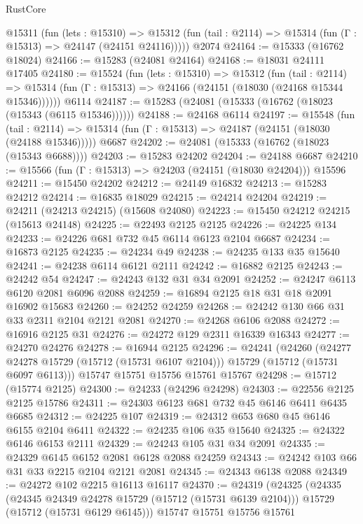 \begin{lexlean}{RustCore}
\begin{coremodule}
    @15311
      (fun (lets : @15310) =>
      @15312 (fun (tail : @2114) => @15314 (fun (Γ : @15313) => @24147 (@24151 @24116)))))
    @2074
@24164 := @15333 (@16762 @18024)
@24166 := @15283 (@24081 @24164)
@24168 := @18031 @24111 @17405
@24180 := @15524
    (fun (lets : @15310) =>
    @15312
      (fun (tail : @2114) =>
      @15314 (fun (Γ : @15313) => @24166 (@24151 (@18030 (@24168 @15344 @15346))))))
    @6114
@24187 := @15283 (@24081 (@15333 (@16762 (@18023 (@15343 (@6115 @15346))))))
@24188 := @24168 @6114
@24197 := @15548
    (fun (tail : @2114) => @15314 (fun (Γ : @15313) => @24187 (@24151 (@18030 (@24188 @15346)))))
    @6687
@24202 := @24081 (@15333 (@16762 (@18023 (@15343 @6688))))
@24203 := @15283 @24202
@24204 := @24188 @6687
@24210 := @15566 (fun (Γ : @15313) => @24203 (@24151 (@18030 @24204))) @15596
@24211 := @15450 @24202
@24212 := @24149 @16832
@24213 := @15283 @24212
@24214 := @16835 @18029
@24215 := @24214 @24204
@24219 := @24211 (@24213 @24215) (@15608 @24080)
@24223 := @15450 @24212 @24215 (@15613 @24148)
@24225 := @22493 @2125 @2125
@24226 := @24225 @134
@24233 := @24226 @681 @732 @45 @6114 @6123 @2104 @6687
@24234 := @16873 @2125
@24235 := @24234 @49
@24238 := @24235 @133 @35 @15640
@24241 := @24238 @6114 @6121 @2111
@24242 := @16882 @2125
@24243 := @24242 @54
@24247 := @24243 @132 @31 @34 @2091
@24252 := @24247 @6113 @6120 @2081 @6096 @2088
@24259 := @16894 @2125 @18 @31 @18 @2091 @16902 @15683
@24260 := @24252 @24259
@24268 := @24242 @130 @66 @31 @33 @2311 @2104 @2121 @2081
@24270 := @24268 @6106 @2088
@24272 := @16916 @2125 @31
@24276 := @24272 @129 @2311 @16339 @16343
@24277 := @24270 @24276
@24278 := @16944 @2125
@24296 := @24241
    (@24260
      (@24277 @24278 @15729 (@15712 (@15731 @6107 @2104)))
      @15729
      (@15712 (@15731 @6097 @6113)))
    @15747
    @15751
    @15756
    @15761
    @15767
@24298 := @15712 (@15774 @2125)
@24300 := @24233 (@24296 @24298)
@24303 := @22556 @2125 @2125 @15786
@24311 := @24303 @6123 @681 @732 @45 @6146 @6411 @6435 @6685
@24312 := @24225 @107
@24319 := @24312 @653 @680 @45 @6146 @6155 @2104 @6411
@24322 := @24235 @106 @35 @15640
@24325 := @24322 @6146 @6153 @2111
@24329 := @24243 @105 @31 @34 @2091
@24335 := @24329 @6145 @6152 @2081 @6128 @2088 @24259
@24343 := @24242 @103 @66 @31 @33 @2215 @2104 @2121 @2081
@24345 := @24343 @6138 @2088
@24349 := @24272 @102 @2215 @16113 @16117
@24370 := @24319
    (@24325
      (@24335
        (@24345 @24349 @24278 @15729 (@15712 (@15731 @6139 @2104)))
        @15729
        (@15712 (@15731 @6129 @6145)))
      @15747
      @15751
      @15756
      @15761

\end{coremodule}
\end{lexlean}

